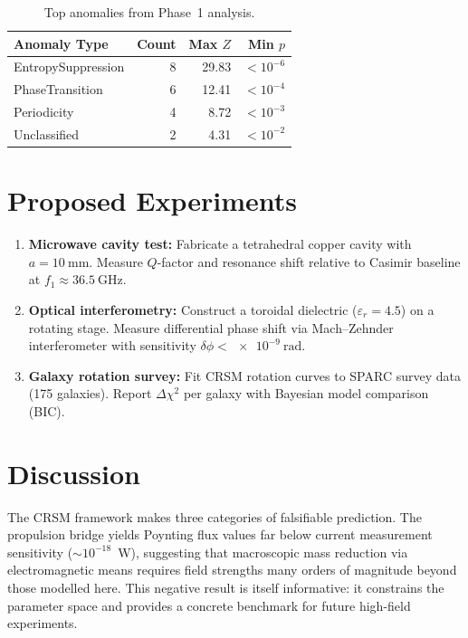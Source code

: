 \documentclass[twocolumn,aps,prl,superscriptaddress,showpacs]{revtex4-2}
\begin{document}
\begin{table}[h]
\centering
\caption{Top anomalies from Phase~1 analysis.}
\label{tab:anomalies}
\begin{tabular}{lrrr}
\toprule
Anomaly Type & Count & Max $Z$ & Min $p$ \\
\midrule
EntropySuppression & 8 & 29.83 & $<10^{-6}$ \\
PhaseTransition    & 6 & 12.41 & $<10^{-4}$ \\
Periodicity        & 4 &  8.72 & $<10^{-3}$ \\
Unclassified       & 2 &  4.31 & $<10^{-2}$ \\
\bottomrule
\end{tabular}
\end{table}

\section{Proposed Experiments}
\label{sec:experiments}

\begin{enumerate}
\item \textbf{Microwave cavity test:}
Fabricate a tetrahedral copper cavity with $a = \SI{10}{\milli\metre}$.
Measure $Q$-factor and resonance shift relative to Casimir baseline
at $f_1 \approx \SI{36.5}{\giga\hertz}$.

\item \textbf{Optical interferometry:}
Construct a toroidal dielectric ($\varepsilon_r = 4.5$) on
a rotating stage.  Measure differential phase shift via
Mach--Zehnder interferometer with sensitivity
$\delta\phi < \SI{e-9}{\radian}$.

\item \textbf{Galaxy rotation survey:}
Fit CRSM rotation curves to SPARC survey data (175 galaxies).
Report $\Delta\chi^2$ per galaxy with Bayesian model comparison
(BIC).
\end{enumerate}

\section{Discussion}
\label{sec:discussion}

The CRSM framework makes three categories of falsifiable prediction.
The propulsion bridge yields Poynting flux values far below
current measurement sensitivity ($\sim 10^{-18}$~W), suggesting that
macroscopic mass reduction via electromagnetic means requires
field strengths many orders of magnitude beyond those modelled here.
This negative result is itself informative: it constrains the
parameter space and provides a concrete benchmark for future
high-field experiments.
\end{document}
